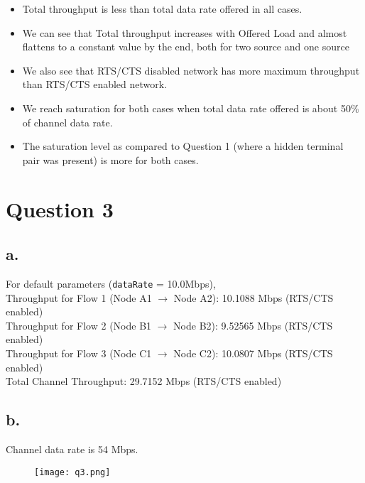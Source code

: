 \documentclass[11pt, fleqn]{article}
\begin{document}
\begin{itemize}
    \item Total throughput is less than total data rate offered in all cases.
    \item We can see that Total throughput increases with Offered Load and almost flattens to a constant value by the end, both for two source and one source
    \item We also see that RTS/CTS disabled network has more maximum throughput than RTS/CTS enabled network.
    \item We reach saturation for both cases when total data rate offered is about 50\% of channel data rate.
    \item The saturation level as compared to Question 1 (where a hidden terminal pair was present) is more for both cases.
\end{itemize}

\newpage 
\section*{Question 3}
\setcounter{equation}{0}

\subsection*{a.}

For default parameters (\texttt{dataRate} = 10.0Mbps),\\

Throughput for Flow 1 (Node A1 $\rightarrow$ Node A2): 10.1088 Mbps (RTS/CTS enabled) \\
Throughput for Flow 2 (Node B1 $\rightarrow$ Node B2): 9.52565 Mbps (RTS/CTS enabled) \\
Throughput for Flow 3 (Node C1 $\rightarrow$ Node C2): 10.0807 Mbps (RTS/CTS enabled) \\

Total Channel Throughput: 29.7152 Mbps (RTS/CTS enabled) \\

\subsection*{b.}

Channel data rate is 54 Mbps.

\begin{figure}[H]
    \centering
    \texttt{[image: q3.png]}
\end{figure}
\end{document}
